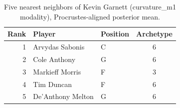 \begin{table}[htbp]
  \centering\small
  \begin{tabular}{rllc}
    \toprule
    Rank & Player & Position & Archetype \\
    \midrule
    1 & Arvydas Sabonis & C & 6 \\
    2 & Cole Anthony & G & 6 \\
    3 & Markieff Morris & F & 3 \\
    4 & Tim Duncan & F & 6 \\
    5 & De'Anthony Melton & G & 6 \\
    \bottomrule
  \end{tabular}
  \caption{Five nearest neighbors of Kevin Garnett (curvature_m1 modality), Procrustes-aligned posterior mean.}
  \label{tab:Kevin_Garnett_neighbors_curvature_m1}
\end{table}

